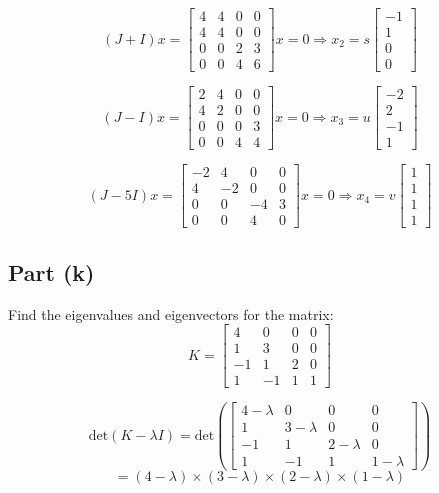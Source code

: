 \documentclass[12pt]{article}
\begin{document}
\[
(J + I)x = \begin{bmatrix} 4 & 4 & 0 & 0 \\ 4 & 4 & 0 & 0 \\ 0 & 0 & 2 & 3 \\ 0 & 0 & 4 & 6 \end{bmatrix}x = 0 \Rightarrow x_2 = s\begin{bmatrix} -1 \\ 1 \\ 0 \\ 0 \end{bmatrix}
\]

\[
(J - I)x = \begin{bmatrix} 2 & 4 & 0 & 0 \\ 4 & 2 & 0 & 0 \\ 0 & 0 & 0 & 3 \\ 0 & 0 & 4 & 4 \end{bmatrix}x = 0 \Rightarrow x_3 = u\begin{bmatrix} -2 \\ 2 \\ -1 \\ 1 \end{bmatrix}
\]

\[
(J - 5I)x = \begin{bmatrix} -2 & 4 & 0 & 0 \\ 4 & -2 & 0 & 0 \\ 0 & 0 & -4 & 3 \\ 0 & 0 & 4 & 0 \end{bmatrix}x = 0 \Rightarrow x_4 = v\begin{bmatrix} 1 \\ 1 \\ 1 \\ 1 \end{bmatrix}
\]

\pagebreak


\subsection*{Part (k)}
Find the eigenvalues and eigenvectors for the matrix:
\[
K = \begin{bmatrix} 4 & 0 & 0 & 0 \\ 1 & 3 & 0 & 0 \\ -1 & 1 & 2 & 0 \\ 1 & -1 & 1 & 1 \end{bmatrix}
\]

\[
\text{det}(K - \lambda I) = \text{det}\left(\begin{bmatrix} 4-\lambda & 0 & 0 & 0 \\ 1 & 3-\lambda & 0 & 0 \\ -1 & 1 & 2-\lambda & 0 \\ 1 & -1 & 1 & 1-\lambda \end{bmatrix}\right)
\]
\[
= (4-\lambda) \times (3-\lambda) \times (2-\lambda) \times (1-\lambda)
\]
\end{document}
